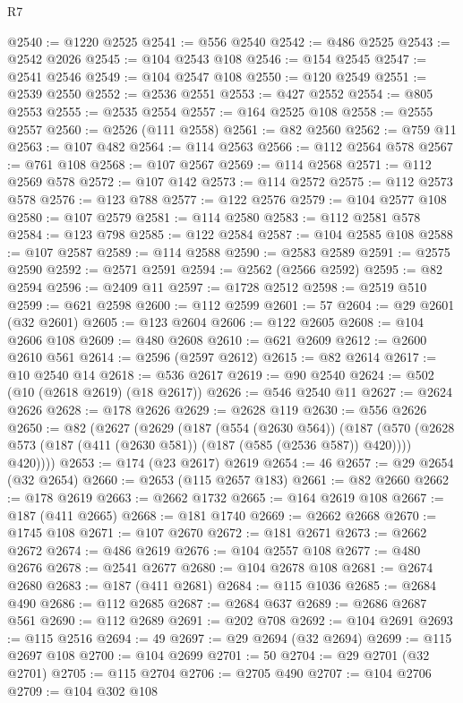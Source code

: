 \begin{lexlean}{R7}
\begin{coremodule}
@2540 := @1220 @2525
@2541 := @556 @2540
@2542 := @486 @2525
@2543 := @2542 @2026
@2545 := @104 @2543 @108
@2546 := @154 @2545
@2547 := @2541 @2546
@2549 := @104 @2547 @108
@2550 := @120 @2549
@2551 := @2539 @2550
@2552 := @2536 @2551
@2553 := @427 @2552
@2554 := @805 @2553
@2555 := @2535 @2554
@2557 := @164 @2525 @108
@2558 := @2555 @2557
@2560 := @2526 (@111 @2558)
@2561 := @82 @2560
@2562 := @759 @11
@2563 := @107 @482
@2564 := @114 @2563
@2566 := @112 @2564 @578
@2567 := @761 @108
@2568 := @107 @2567
@2569 := @114 @2568
@2571 := @112 @2569 @578
@2572 := @107 @142
@2573 := @114 @2572
@2575 := @112 @2573 @578
@2576 := @123 @788
@2577 := @122 @2576
@2579 := @104 @2577 @108
@2580 := @107 @2579
@2581 := @114 @2580
@2583 := @112 @2581 @578
@2584 := @123 @798
@2585 := @122 @2584
@2587 := @104 @2585 @108
@2588 := @107 @2587
@2589 := @114 @2588
@2590 := @2583 @2589
@2591 := @2575 @2590
@2592 := @2571 @2591
@2594 := @2562 (@2566 @2592)
@2595 := @82 @2594
@2596 := @2409 @11
@2597 := @1728 @2512
@2598 := @2519 @510
@2599 := @621 @2598
@2600 := @112 @2599
@2601 := 57
@2604 := @29 @2601 (@32 @2601)
@2605 := @123 @2604
@2606 := @122 @2605
@2608 := @104 @2606 @108
@2609 := @480 @2608
@2610 := @621 @2609
@2612 := @2600 @2610 @561
@2614 := @2596 (@2597 @2612)
@2615 := @82 @2614
@2617 := @10 @2540 @14
@2618 := @536 @2617
@2619 := @90 @2540
@2624 := @502 (@10 (@2618 @2619) (@18 @2617))
@2626 := @546 @2540 @11
@2627 := @2624 @2626
@2628 := @178 @2626
@2629 := @2628 @119
@2630 := @556 @2626
@2650 := @82
    (@2627
      (@2629
        (@187
          (@554 (@2630 @564))
          (@187
            (@570 (@2628 @573 (@187 (@411 (@2630 @581)) (@187 (@585 (@2536 @587)) @420))))
            @420))))
@2653 := @174 (@23 @2617) @2619
@2654 := 46
@2657 := @29 @2654 (@32 @2654)
@2660 := @2653 (@115 @2657 @183)
@2661 := @82 @2660
@2662 := @178 @2619
@2663 := @2662 @1732
@2665 := @164 @2619 @108
@2667 := @187 (@411 @2665)
@2668 := @181 @1740
@2669 := @2662 @2668
@2670 := @1745 @108
@2671 := @107 @2670
@2672 := @181 @2671
@2673 := @2662 @2672
@2674 := @486 @2619
@2676 := @104 @2557 @108
@2677 := @480 @2676
@2678 := @2541 @2677
@2680 := @104 @2678 @108
@2681 := @2674 @2680
@2683 := @187 (@411 @2681)
@2684 := @115 @1036
@2685 := @2684 @490
@2686 := @112 @2685
@2687 := @2684 @637
@2689 := @2686 @2687 @561
@2690 := @112 @2689
@2691 := @202 @708
@2692 := @104 @2691
@2693 := @115 @2516
@2694 := 49
@2697 := @29 @2694 (@32 @2694)
@2699 := @115 @2697 @108
@2700 := @104 @2699
@2701 := 50
@2704 := @29 @2701 (@32 @2701)
@2705 := @115 @2704
@2706 := @2705 @490
@2707 := @104 @2706
@2709 := @104 @302 @108

\end{coremodule}
\end{lexlean}
